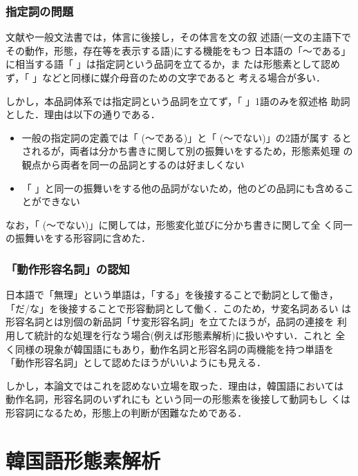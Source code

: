 \subsubsection{指定詞の問題}

文献\cite{国語大辞典}や一般文法書では，体言に後接し，その体言を文の叙
述語(一文の主語下でその動作，形態，存在等を表示する語)にする機能をもつ
日本語の「〜である」に相当する語「
」は指定詞という品詞を立てるか，ま
たは形態素として認めず，「
」などと同様に媒介母音のための文字であると
考える場合が多い．

しかし，本品詞体系では指定詞という品詞を立てず，「
」1語のみを叙述格
助詞とした．理由は以下の通りである．

\begin{itemize}
\item 
一般の指定詞の定義では「
(〜である)」と「
(〜でない)」の2語が属す
るとされるが，両者は分かち書きに関して別の振舞いをするため，形態素処理
の観点から両者を同一の品詞とするのは好ましくない
\item 
「
」と同一の振舞いをする他の品詞がないため，他のどの品詞にも含めるこ
とができない
\end{itemize}

なお，「
(〜でない)」に関しては，形態変化並びに分かち書きに関して全
く同一の振舞いをする形容詞に含めた．


\subsubsection{「動作形容名詞」の認知}

日本語で「無理」という単語は，「する」を後接することで動詞として働き，
「だ/な」を後接することで形容動詞として働く．このため，サ変名詞あるい
は形容名詞とは別個の新品詞「サ変形容名詞」を立てたほうが，品詞の連接を
利用して統計的な処理を行なう場合(例えば形態素解析)に扱いやすい．これと
全く同様の現象が韓国語にもあり，動作名詞と形容名詞の両機能を持つ単語を
「動作形容名詞」として認めたほうがいいようにも見える．

しかし，本論文ではこれを認めない立場を取った．理由は，韓国語においては
動作名詞，形容名詞のいずれにも
という同一の形態素を後接して動詞もし
くは形容詞になるため，形態上の判断が困難なためである．



\section{韓国語形態素解析}
\label{節:形態素解析}

